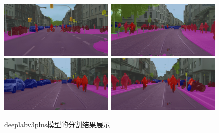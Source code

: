 \documentclass[12pt]{ctexart}
\begin{document}
\begin{figure}[htbp]  %
    \centering        %
    \includegraphics[width=0.49\textwidth]{result/plot/result_deeplabv3plus.jpg}
    \includegraphics[width=0.49\textwidth]{result/plot/result_1_deeplabv3plus.jpg}
    \includegraphics[width=0.49\textwidth]{result/plot/result_2_deeplabv3plus.jpg}
    \includegraphics[width=0.49\textwidth]{result/plot/result_3_deeplabv3plus.jpg}
    \caption{deeplabv3plus模型的分割结果展示}
    \label{fig:result_deeplabv3plus}
\end{figure}
\end{document}
